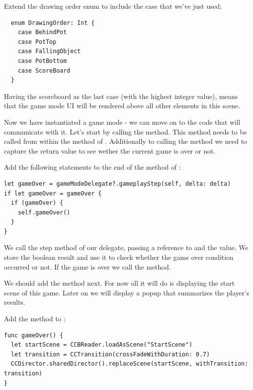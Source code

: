 \begin{leftbar}
Extend the drawing order enum to include the case
 that we've just used:
\begin{lstlisting}
  enum DrawingOrder: Int {
    case BehindPot
    case PotTop
    case FallingObject
    case PotBottom
    case ScoreBoard
  }
\end{lstlisting}
\end{leftbar}
Having the scoreboard as the last case (with the highest integer value),
means that the game mode UI will be rendered above all other elements in this
scene.

Now we have instantiated a game mode - we can move on to the code that will
communicate with it. Let's start by calling the
 method. This method needs to be
called from within the  method of .
Additionally to calling the method we need to capture the return value to see
wether the current game is over or not.

\begin{leftbar}
Add the following statements to the end of the  method of
:
\begin{lstlisting}
let gameOver = gameModeDelegate?.gameplayStep(self, delta: delta)
if let gameOver = gameOver {
  if (gameOver) {
    self.gameOver()
  }
}
\end{lstlisting}
\end{leftbar}
We call the step method of our delegate, passing a reference to
 and the  value. We store the boolean result
and use it to check whether the game over condition occurred or not. If the game
is over we call the  method.

We should add the  method next. For now all it will do is
displaying the start scene of this game. Later on we will display a popup
that summarizes the player's results.

\begin{leftbar}
Add the  method to :
\begin{lstlisting}
func gameOver() {
  let startScene = CCBReader.loadAsScene("StartScene")
  let transition = CCTransition(crossFadeWithDuration: 0.7)
  CCDirector.sharedDirector().replaceScene(startScene, withTransition: transition)
}
\end{lstlisting}
\end{leftbar}

